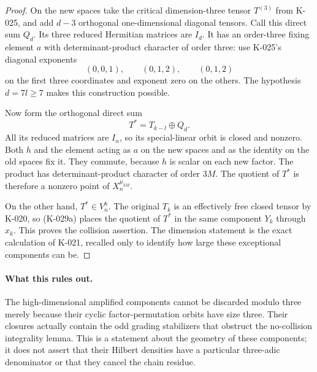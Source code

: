 \begin{proof}
On the new spaces take the critical dimension-three tensor
$T^{(3)}$ from K-025, and add $d-3$ orthogonal one-dimensional
diagonal tensors.  Call this direct sum $Q_d$.  Its three reduced
Hermitian matrices are $I_d$.  It has an order-three fixing
element $a$ with determinant-product character of order three:
use K-025's diagonal exponents
\[
                 (0,0,1),\qquad(0,1,2),\qquad(0,1,2)
                                                        \tag{K-029c}
\]
on the first three coordinates and exponent zero on the others.
The hypothesis $d=7l\ge7$ makes this construction possible.

Now form the orthogonal direct sum
\[
                       T^*=T_{k-l}\oplus Q_d.
                                                        \tag{K-029d}
\]
All its reduced matrices are $I_n$, so its special-linear orbit
is closed and nonzero.  Both $h$ and the element acting as $a$
on the new spaces and as the identity on the old spaces fix it.
They commute, because $h$ is scalar on each new factor.  The
product has determinant-product character of order $3M$.
The quotient of $T^*$ is therefore a nonzero point of
$X_n^{\mu_{3M}}$.

On the other hand, $T^*\in V_n^h$.  The original $T_k$ is an
effectively free closed tensor by K-020, so (K-029a) places the
quotient of $T^*$ in the same component $Y_k$ through $x_k$.
This proves the collision assertion.  The dimension statement
is the exact calculation of K-021, recalled only to identify
how large these exceptional components can be.
\end{proof}

\paragraph{What this rules out.}
The high-dimensional amplified components cannot be discarded
modulo three merely because their cyclic factor-permutation
orbits have size three.  Their closures actually contain the
odd grading stabilizers that obstruct the no-collision integrality
lemma.  This is a statement about the geometry of these components;
it does not assert that their Hilbert densities have a particular
three-adic denominator or that they cancel the chain residue.

